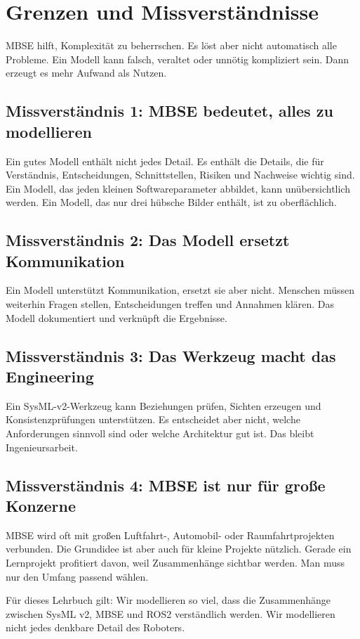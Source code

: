 \section{Grenzen und Missverständnisse}
MBSE hilft, Komplexität zu beherrschen. Es löst aber nicht automatisch alle Probleme. Ein Modell kann falsch, veraltet oder unnötig kompliziert sein. Dann erzeugt es mehr Aufwand als Nutzen.

\subsection{Missverständnis 1: MBSE bedeutet, alles zu modellieren}
Ein gutes Modell enthält nicht jedes Detail. Es enthält die Details, die für Verständnis, Entscheidungen, Schnittstellen, Risiken und Nachweise wichtig sind. Ein Modell, das jeden kleinen Softwareparameter abbildet, kann unübersichtlich werden. Ein Modell, das nur drei hübsche Bilder enthält, ist zu oberflächlich.

\subsection{Missverständnis 2: Das Modell ersetzt Kommunikation}
Ein Modell unterstützt Kommunikation, ersetzt sie aber nicht. Menschen müssen weiterhin Fragen stellen, Entscheidungen treffen und Annahmen klären. Das Modell dokumentiert und verknüpft die Ergebnisse.

\subsection{Missverständnis 3: Das Werkzeug macht das Engineering}
Ein SysML-v2-Werkzeug kann Beziehungen prüfen, Sichten erzeugen und Konsistenzprüfungen unterstützen. Es entscheidet aber nicht, welche Anforderungen sinnvoll sind oder welche Architektur gut ist. Das bleibt Ingenieursarbeit.

\subsection{Missverständnis 4: MBSE ist nur für große Konzerne}
MBSE wird oft mit großen Luftfahrt-, Automobil- oder Raumfahrtprojekten verbunden. Die Grundidee ist aber auch für kleine Projekte nützlich. Gerade ein Lernprojekt profitiert davon, weil Zusammenhänge sichtbar werden. Man muss nur den Umfang passend wählen.

\begin{hinweisbox}
Für dieses Lehrbuch gilt: Wir modellieren so viel, dass die Zusammenhänge zwischen SysML v2, MBSE und ROS2 verständlich werden. Wir modellieren nicht jedes denkbare Detail des Roboters.
\end{hinweisbox}


